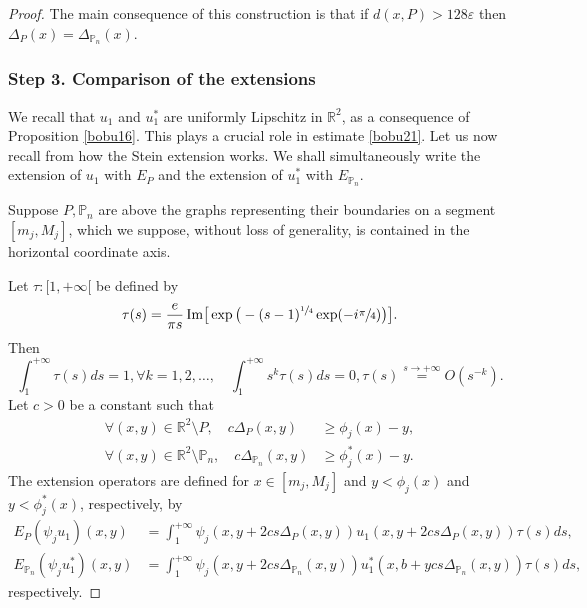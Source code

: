 \documentclass[11pt]{article}
\numberwithin{equation}{section}\newtheorem*{jepEnonce}{\jepEnonceTitle}\newenvironment{enonce*}[1]{\def\jepEnonceTitle{#1}\jepEnonce}{\endjepEnonce}\newtheorem*{conj*}{Conjecture}
\theoremstyle{plain}
\theoremstyle{definition}
\let\Bbb\mathbb
\def\R{\mathbb{R}}
\newcommand{\vps}{\varepsilon}
\let\jepOriginalSfrac\sfrac
\renewcommand{\sfrac}[2]{{\jepOriginalSfrac{#1}{#2}}}
\begin{document}
\begin{proof}
The main consequence of this construction is that if $d(x, P) > 128 \vps$ then $\Delta_P(x) =\Delta_{\Bbb P_n}(x)$.

\subsubsection*{Step 3. Comparison of the extensions} We recall that $u_1$ and $u_1^*$ are uniformly Lipschitz in $\R^2$, as a consequence of Proposition \ref{bobu16}. This plays a crucial role in estimate \eqref{bobu21}. Let us now recall from \cite{St70} how the Stein extension works. We shall simultaneously write the extension of $u_1$ with $E_P$ and the extension of $u_1^*$ with $E_{\Bbb P_n}$.

Suppose $P, \Bbb P_n$ are above the graphs representing their boundaries on a segment $[m_j,M_j]$, which we suppose, without loss of generality, is contained in the horizontal coordinate axis.

Let $\tau :[1, +\infty[$ be defined by
\[
\tau (s)= \frac{e}{\pi s}\, \text{Im} \big [ \exp \big (-(s-1)^{\sfrac 14} \exp (-i \sfrac{\pi}{4})\big) \big ].
\]
Then
\[
\int_1^{+\infty} \tau (s) ds =1, \forall k=1, 2,\dots,\quad \int_1^{+\infty} s^k \tau (s) ds =0, \tau (s) \stackrel{s \rightarrow +\infty}{=} O(s^{-k}).
\]
Let $c>0$ be a constant such that
\begin{align*}
\forall (x,y) \in \R^2 \setminus P, \quad c \Delta_P (x,y) &\ge \phi_j (x) -y,
\\
\forall (x,y) \in \R^2 \setminus \Bbb P_n, \quad c \Delta_{\Bbb P_n} (x,y) &\ge \phi^*_j (x) -y.
\end{align*}
The extension operators are defined for $x \in [m_j,M_j]$ and $ y <\phi_j (x)$ and $ y < \phi_j^*(x)$, respectively, by
\begin{align*}
E_P(\psi_j u_1)(x,y)&= \int_1^{+\infty} \psi_j(x, y+2 cs \Delta_P(x,y)) u_1(x, y+2 cs \Delta_P(x,y))\tau (s) ds,
\\
E_{\Bbb P_n}(\psi_j u^*_1)(x,y)&= \int_1^{+\infty} \psi_j (x, y+2 cs \Delta_{\Bbb P_n}(x,y)) u_1^*(x, b+y cs \Delta_{\Bbb P_n}(x,y))\tau (s) ds,
\end{align*}
respectively.


\end{proof}
\end{document}

